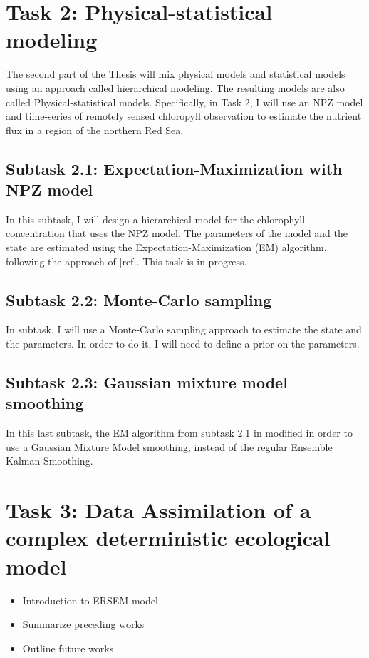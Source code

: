 	\section{Task 2: Physical-statistical modeling}
	\label{physstat}

		The second part of the Thesis will mix physical models and statistical models using an approach called hierarchical modeling. The resulting models are also called Physical-statistical models. Specifically, in Task 2, I will use an NPZ model and time-series of remotely sensed chloropyll observation to estimate the nutrient flux in a region of the northern Red Sea.

		\subsection{Subtask 2.1: Expectation-Maximization with NPZ model}
		\label{physstat:EM}

			In this subtask, I will design a hierarchical model for the chlorophyll concentration that uses the NPZ model. The parameters of the model and the state are estimated using the Expectation-Maximization (EM) algorithm, following the approach of [ref]. This task is in progress. 
			

		\subsection{Subtask 2.2: Monte-Carlo sampling}
		\label{physstat:bayes}

			In subtask, I will use a Monte-Carlo sampling approach to estimate the state and the parameters. In order to do it, I will need to define a prior on the parameters. 

		\subsection{Subtask 2.3: Gaussian mixture model smoothing}
		\label{physstat:GM}

			In this last subtask, the EM algorithm from subtask 2.1 in modified in order to use a Gaussian Mixture Model smoothing, instead of the regular Ensemble Kalman Smoothing.  

	\section{Task 3: Data Assimilation of a complex deterministic ecological model}
	\label{moddriv}

		\begin{itemize}
			\item Introduction to ERSEM model
			\item Summarize preceding works
			\item Outline future works
		\end{itemize}